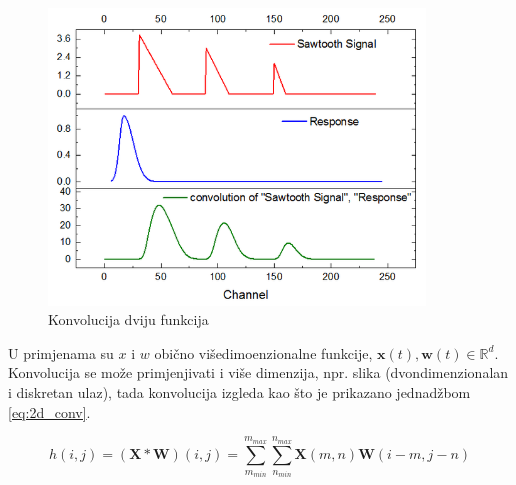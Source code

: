 \begin{figure}[htb]
\centering
\includegraphics[width=10cm]{img/MathConvolution.png}
\caption{Konvolucija dviju funkcija}
\label{img:convolution}
\end{figure}

U primjenama su $x$ i $w$ obično višedimoenzionalne funkcije, $\mathbf{x}(t), \mathbf{w}(t) \in \mathbb{R}^d$. Konvolucija se može primjenjivati i više dimenzija, npr. slika (dvondimenzionalan i diskretan ulaz), tada konvolucija izgleda kao što je prikazano jednadžbom \ref{eq:2d_conv}.

\begin{equation}
h(i,j) = (\mathbf{X} * \mathbf{W})(i,j) = \sum_{m_{min}}^{m_{max}} \sum_{n_{min}}^{n_{max}} \mathbf{X}(m,n)\mathbf{W}(i - m, j - n)
\label{eq:2d_conv}
\end{equation}

